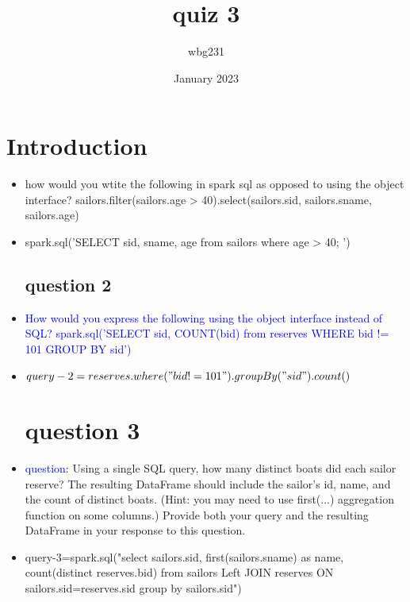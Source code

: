 \documentclass{article}
\title{quiz 3 }
\author{wbg231 }
\date{January 2023}
\begin{document}
\maketitle

\section{Introduction}
\begin{itemize}
\section*{part 1}
\subsection*{question 1 }
\item how would you wtite the following in spark sql as opposed to using the object interface? 
sailors.filter(sailors.age > 40).select(sailors.sid, sailors.sname, sailors.age)
\item spark.sql('SELECT sid, sname, age from sailors where age > 40; ')
\subsection*{question 2 }
\item \textcolor{blue}{How would you express the following using the object interface instead of SQL? spark.sql('SELECT sid, COUNT(bid) from reserves WHERE bid != 101 GROUP BY sid')}
\item $query-2=reserves.where("bid != 101").groupBy("sid").count()$ 
\section*{question 3}
\item \textcolor{blue}{question}:  Using a single SQL query, how many distinct boats did each sailor reserve? The resulting DataFrame should include the sailor's id, name, and the count of distinct boats. (Hint: you may need to use first(...) aggregation function on some columns.) Provide both your query and the resulting DataFrame in your response to this question.
\item query-3=spark.sql("select  sailors.sid, first(sailors.sname) as name, count(distinct reserves.bid) from sailors Left JOIN reserves ON sailors.sid=reserves.sid group by sailors.sid") 

\end{itemize}
\end{document}
